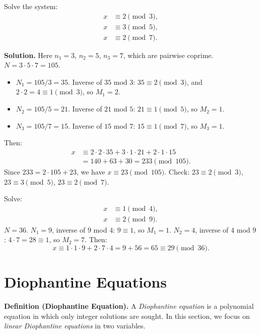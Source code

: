 \documentclass[11pt,a4paper]{article}
\begin{document}
\begin{example}
Solve the system:
\begin{align*}
    x &\equiv 2 \pmod{3}, \\
    x &\equiv 3 \pmod{5}, \\
    x &\equiv 2 \pmod{7}.
\end{align*}

\textbf{Solution.} Here $n_1 = 3$, $n_2 = 5$, $n_3 = 7$, which are pairwise coprime. $N = 3 \cdot 5 \cdot 7 = 105$.
\begin{itemize}[label=--]
    \item $N_1 = 105/3 = 35$. Inverse of $35$ mod $3$: $35 \equiv 2 \pmod{3}$, and $2 \cdot 2 = 4 \equiv 1 \pmod{3}$, so $M_1 = 2$.
    \item $N_2 = 105/5 = 21$. Inverse of $21$ mod $5$: $21 \equiv 1 \pmod{5}$, so $M_2 = 1$.
    \item $N_3 = 105/7 = 15$. Inverse of $15$ mod $7$: $15 \equiv 1 \pmod{7}$, so $M_3 = 1$.
\end{itemize}
Then:
\begin{align*}
    x &\equiv 2 \cdot 2 \cdot 35 + 3 \cdot 1 \cdot 21 + 2 \cdot 1 \cdot 15 \\
      &= 140 + 63 + 30 = 233 \pmod{105}.
\end{align*}
Since $233 = 2 \cdot 105 + 23$, we have $x \equiv 23 \pmod{105}$.
Check: $23 \equiv 2 \pmod{3}$, $23 \equiv 3 \pmod{5}$, $23 \equiv 2 \pmod{7}$.
\end{example}

\begin{example}
Solve:
\begin{align*}
    x &\equiv 1 \pmod{4}, \\
    x &\equiv 2 \pmod{9}.
\end{align*}
$N = 36$. $N_1 = 9$, inverse of $9$ mod $4$: $9 \equiv 1$, so $M_1 = 1$. $N_2 = 4$, inverse of $4$ mod $9$: $4 \cdot 7 = 28 \equiv 1$, so $M_2 = 7$. Then:
\begin{equation*}
    x \equiv 1 \cdot 1 \cdot 9 + 2 \cdot 7 \cdot 4 = 9 + 56 = 65 \equiv 29 \pmod{36}.
\end{equation*}
\end{example}

\section{Diophantine Equations}

\textbf{Definition (Diophantine Equation).} A \textit{Diophantine equation} is a polynomial equation in which only integer solutions are sought. In this section, we focus on \textit{linear Diophantine equations} in two variables.
\end{document}
